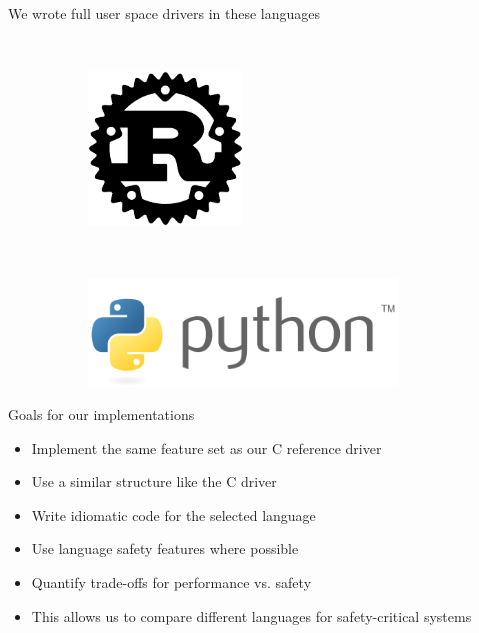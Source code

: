 \documentclass[NET,english,aspectratio=169,notitleframe]{tumbeamer}
\begin{document}
\begin{frame}{We wrote full user space drivers in these languages}
\begin{figure}
\begin{subfigure}[t]{0.2\columnwidth}
    \end{subfigure}
    ~ 
    \begin{subfigure}[t]{0.2\columnwidth}
        \centering
        \includegraphics[width=0.45\textwidth]{pics/rust}
    \end{subfigure}
    ~ 
    \begin{subfigure}[t]{0.3\columnwidth}
	\centering
        \includegraphics[width=0.9\textwidth]{pics/python}
    \end{subfigure}
\end{figure}
\end{frame}

\begin{frame}{Goals for our implementations}
\begin{itemize}
\item Implement the same feature set as our C reference driver
\item Use a similar structure like the C driver
\item Write idiomatic code for the selected language
\item Use language safety features where possible
\item Quantify trade-offs for performance vs. safety
\vspace{1em}
\item This allows us to compare different languages for safety-critical systems
\end{itemize}
\end{frame}
\end{document}
